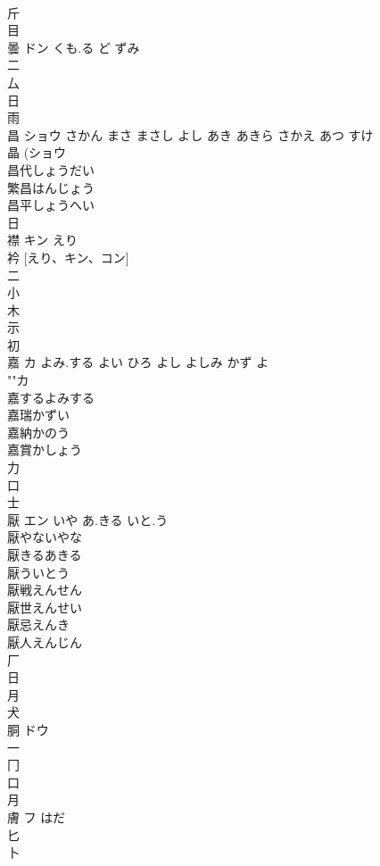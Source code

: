 \documentclass[8pt]{extreport}
\begin{document}
\begin{CJK}{UTF8}{min}
\\	斤 
\\	目 
\\	曇	ドン	くも.る ど ずみ	
\\	二 
\\	厶 
\\	日 
\\	雨 
\\	昌	ショウ	さかん まさ まさし よし あき あきら さかえ あつ すけ	
\\	晶 (ショウ 
\\	昌代しょうだい 
\\	繁昌はんじょう 
\\	昌平しょうへい 
\\	日 
\\	襟	キン	えり	
\\	衿 [えり、キン、コン] 
\\	二 
\\	小 
\\	木 
\\	示 
\\	初 
\\	嘉	カ	よみ.する よい ひろ よし よしみ かず よ	
\\	""カ
\\	嘉するよみする
\\	嘉瑞かずい
\\	嘉納かのう
\\	嘉賞かしょう
\\	力 
\\	口 
\\	士 
\\	厭	エン	いや あ.きる いと.う	
\\	厭やないやな 
\\	厭きるあきる 
\\	厭ういとう 
\\	厭戦えんせん 
\\	厭世えんせい 
\\	厭忌えんき 
\\	厭人えんじん 
\\	厂 
\\	日 
\\	月 
\\	犬 
\\	胴	ドウ		
\\	一 
\\	冂 
\\	口 
\\	月 
\\	膚	フ	はだ	
\\	匕 
\\	卜 

\end{CJK}
\end{document}
